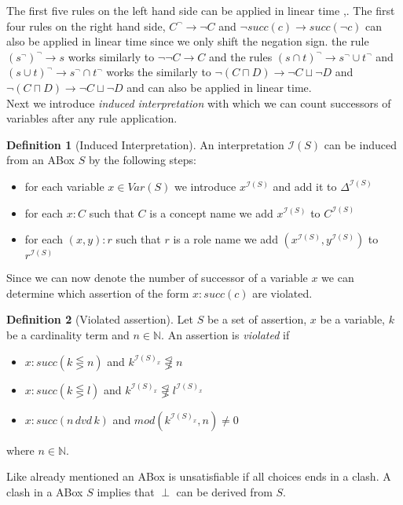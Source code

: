 \documentclass[a4paper,11pt]{scrartcl}
\theoremstyle{break}
\theoremstyle{definition}
\newtheorem{mydef}{Definition}
\begin{document}
The first five rules on the left hand side can be applied in linear time \cite{1},\cite{6}. The first four rules on the right hand side, $C^\neg\rightarrow \neg C$ and $\neg succ(c)\rightarrow succ(\neg c)$ can also be applied in linear time since we only shift the negation sign. the rule $(s^\neg)^\neg\rightarrow s$ works similarly to $\neg\neg C\rightarrow C$ and the rules $(s\cap t)^\neg\rightarrow s^\neg\cup t^\neg$ and $(s\cup t)^\neg\rightarrow s^\neg \cap t^\neg$ works the similarly to $\neg(C\sqcap D)\rightarrow \neg C\sqcup \neg D$ and $\neg(C\sqcap D)\rightarrow \neg C\sqcup \neg D$ and can also be applied in linear time.\\
Next we introduce \textit{induced interpretation} with which we can count successors of variables after any rule application.
\begin{mydef}[Induced Interpretation]
An interpretation $\mathcal{I}(S)$ can be induced from an ABox $S$ by the following steps:
\begin{itemize}
\item for each variable $x\in Var(S)$ we introduce $x^{\mathcal{I}(S)}$ and add it to $\Delta^{\mathcal{I}(S)}$
\item for each $x:C$ such that $C$ is a concept name we add $x^{\mathcal{I}(S)}$ to $C^{\mathcal{I}(S)}$
\item for each $(x,y):r$ such that $r$ is a role name we add $(x^{\mathcal{I}(S)},y^{\mathcal{I}(S)})$ to $r^{\mathcal{I}(S)}$
\end{itemize}
\end{mydef}
Since we can now denote the number of successor of a variable $x$ we can determine which assertion of the form $x:succ(c)$ are violated.
\begin{mydef}[Violated assertion]
Let $S$ be a set of assertion, $x$ be a variable, $k$ be a cardinality term and $n\in\mathbb{N}$. An assertion is \textit{violated} if
\begin{itemize}
\item $x:succ(k\lesseqgtr n)$ and $k^{\mathcal{I}(S)_x}\not\lesseqgtr n$
\item $x:succ(k\lesseqgtr l)$ and $k^{\mathcal{I}(S)_x}\not\lesseqgtr l^{\mathcal{I}(S)_x}$
\item $x:succ(n\,dvd\,k)$ and $mod(k^{\mathcal{I}(S)_x},n)\neq 0$
\end{itemize} 
where $n\in\mathbb{N}$.
\end{mydef}
Like already mentioned an ABox is unsatisfiable if all choices ends in a clash. A clash in a ABox $S$ implies that $\perp$ can be derived from $S$.
\end{document}
